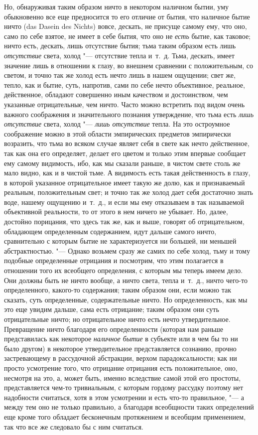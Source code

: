 Но, обнаруживая таким образом ничто в некотором наличном бытии, уму
обыкновенно все еще предносится то его отличие от бытия, что наличное бытие
ничто (das Dasein des Nichts) вовсе, дескать, не присуще самому ему, что
оно, само по себе взятое, не имеет в себе бытия, что оно не
{\em есть} бытие, как таковое; ничто есть, дескать,
лишь отсутствие бытия; тьма таким образом есть лишь
{\em отсутствие} света, холод "--- отсутствие тепла
и~т.~д. Тьма, дескать, имеет значение лишь в отношении к глазу, во внешнем
сравнении с положительным, со светом, и точно так же холод есть нечто лишь
в нашем ощущении; свет же, тепло, как и бытие, суть, напротив, сами по себе
нечто объективное, реальное, действенное, обладают совершенно иным
качеством и достоинством, чем указанные отрицательные, чем ничто. Часто
можно встретить под видом очень важного соображения и значительного
познания утверждение, что тьма есть {\em лишь
отсутствие} света, холод "--- {\em лишь отсутствие} тепла.
На это остроумное соображение можно в этой области эмпирических предметов
эмпирически возразить, что тьма во всяком случае являет себя в свете как
нечто действенное, так как она его определяет, делает его цветом и только
этим впервые сообщает ему самому видимость, ибо, как мы сказали раньше, в
чистом свете столь же мало видно, как и в чистой тьме. А видимость есть
такая действенность в глазу, в которой указанное отрицательное имеет такую
же долю, как и признаваемый реальным, положительным свет; и точно так же
холод дает себя достаточно знать воде, нашему ощущению и~т.~д., и если мы
ему отказываем в так называемой объективной реальности, то от этого в нем
ничего не убывает. Но, далее, достойно порицания, что здесь так же, как и
выше, говорят об отрицательном, обладающем определенным содержанием, идут
дальше самого ничто, сравнительно с которым бытие не характеризуется ни
большей, ни меньшей абстрактностью. "--- Однако возьмем сразу же самих по себе
холод, тьму и тому подобные определенные отрицания и посмотрим, что этим
полагается в отношении того их всеобщего определения, с которым мы теперь
имеем дело. Они должны быть не ничто вообще, а ничто света, тепла и~т.~д.,
ничто чего-то определенного, какого-то содержания; таким образом они, если
можно так сказать, суть определенные, содержательные ничто. Но
определенность, как мы это еще увидим дальше, сама есть отрицание; таким
образом они суть отрицательные ничто; но отрицательное ничто есть нечто
утвердительное. Превращение ничто благодаря его определенности (которая нам
раньше представилась как некоторое {\em наличное бытие}
в субъекте или в чем бы то ни было другом) в некоторое утвердительное
представляется сознанию, прочно застревающему в рассудочной абстракции,
верхом парадоксальности; как ни просто усмотрение того, что отрицание
отрицания есть положительное, оно, несмотря на это, а, может быть, именно
вследствие самой этой его простоты, представляется чем-то тривиальным, с
которым гордому рассудку поэтому нет надобности считаться, хотя в этом
усмотрении и есть что-то правильное, "--- а между тем оно не только правильно,
а благодаря всеобщности таких определений еще кроме того обладает
бесконечным протяжением и всеобщим применением, так что все же следовало бы
с ним считаться.


